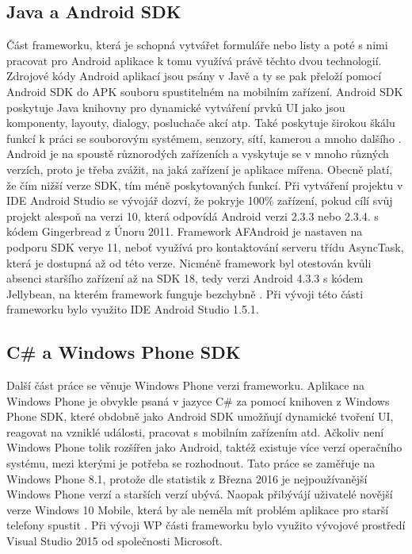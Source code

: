 \subsection{Java a Android SDK}
Část frameworku, která je schopná vytvářet formuláře nebo listy a poté s nimi pracovat pro Android aplikace k tomu využívá právě těchto dvou technologií. Zdrojové kódy Android aplikací jsou psány v Javě a ty se pak přeloží pomocí Android SDK do APK souboru spustitelném na mobilním zařízení. Android SDK poskytuje Java knihovny pro dynamické vytváření prvků UI jako jsou komponenty, layouty, dialogy, posluchače akcí atp. Také poskytuje širokou škálu funkcí k práci se souborovým systémem, senzory, sítí, kamerou a mnoho dalšího \cite{android-intro}. Android je na spoustě různorodých zařízeních a vyskytuje se v mnoho různých verzích, proto je třeba zvážit, na jaká zařízení je aplikace mířena. Obecně platí, že čím nižší verze SDK, tím méně poskytovaných funkcí. Při vytváření projektu v IDE Android Studio se vývojář dozví, že pokryje 100\% zařízení, pokud cílí svůj projekt alespoň na verzi 10, která odpovídá Android verzi 2.3.3 nebo 2.3.4. s kódem Gingerbread z Únoru 2011. Framework AFAndroid je nastaven na podporu SDK verye 11, neboť využívá pro kontaktování serveru třídu AsyncTask, která je dostupná až od této verze. Nicméně framework byl otestován kvůli absenci staršího zařízení až na SDK 18, tedy verzi Android 4.3.3 s kódem Jellybean, na kterém framework funguje bezchybně \cite{android-sdks}. Při vývoji této části frameworku bylo využito IDE Android Studio 1.5.1.

\subsection{C\# a Windows Phone SDK}
Další část práce se věnuje Windows Phone verzi frameworku. Aplikace na Windows Phone je obvykle psaná v jazyce C\# \cite{wp-csharp} za pomocí knihoven z Windows Phone SDK, které obdobně jako Android SDK umožňují dynamické tvoření UI, reagovat na vzniklé události, pracovat s mobilním zařízením atd. Ačkoliv není Windows Phone tolik rozšířen jako Android, taktéž existuje více verzí operačního systému, mezi kterými je potřeba se rozhodnout. Tato práce se zaměřuje na Windows Phone 8.1, protože dle statistik z Března 2016 je nejpoužívanější Windows Phone verzí a starších verzí ubývá. Naopak přibývájí uživatelé novější verze Windows 10 Mobile, která by ale neměla mít problém aplikace pro starší telefony spustit \cite{wp-statistics}. Při vývoji WP části frameworku bylo využito vývojové prostředí Visual Studio 2015 od společnosti Microsoft.

